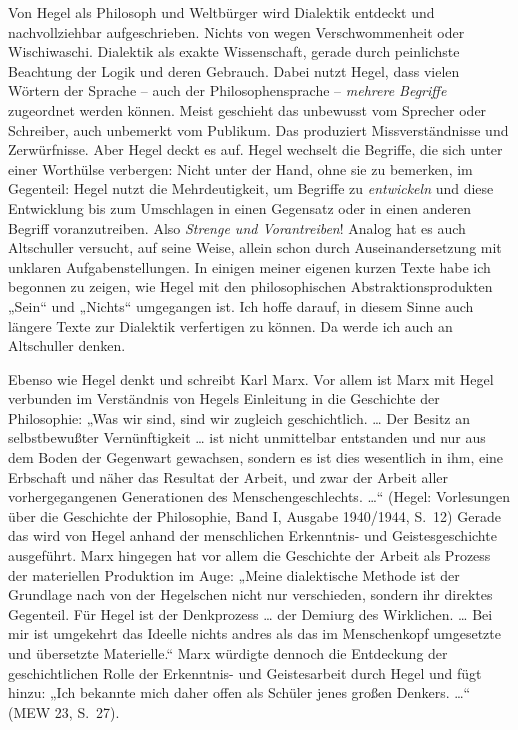 \documentclass[12pt,a4paper]{article}
\begin{document}
Von Hegel als Philosoph und Weltbürger wird Dialektik entdeckt und
nachvollziehbar aufgeschrieben. Nichts von wegen Verschwommenheit oder
Wischiwaschi. Dialektik als exakte Wissenschaft, gerade durch peinlichste
Beachtung der Logik und deren Gebrauch. Dabei nutzt Hegel, dass vielen Wörtern
der Sprache – auch der Philosophensprache – \emph{mehrere Begriffe} zugeordnet
werden können. Meist geschieht das unbewusst vom Sprecher oder Schreiber, auch
unbemerkt vom Publikum. Das produziert Missverständnisse und Zerwürfnisse. Aber
Hegel deckt es auf. Hegel wechselt die Begriffe, die sich unter einer Worthülse
verbergen: Nicht unter der Hand, ohne sie zu bemerken, im Gegenteil: Hegel
nutzt die Mehrdeutigkeit, um Begriffe zu \emph{entwickeln} und diese
Entwicklung bis zum Umschlagen in einen Gegensatz oder in einen anderen Begriff
voranzutreiben.  Also \emph{Strenge und Vorantreiben\/}! Analog hat es auch
Altschuller versucht, auf seine Weise, allein schon durch Auseinandersetzung
mit unklaren Aufgabenstellungen. In einigen meiner eigenen kurzen Texte habe
ich begonnen zu zeigen, wie Hegel mit den philosophischen Abstraktionsprodukten
„Sein“ und „Nichts“ umgegangen ist. Ich hoffe darauf, in diesem Sinne auch
längere Texte zur Dialektik verfertigen zu können. Da werde ich auch an
Altschuller denken.

Ebenso wie Hegel denkt und schreibt Karl Marx. Vor allem ist Marx mit Hegel
verbunden im Verständnis von Hegels Einleitung in die Geschichte der
Philosophie: „Was wir sind, sind wir zugleich geschichtlich. … Der Besitz an
selbstbewußter Vernünftigkeit … ist nicht unmittelbar entstanden und nur aus
dem Boden der Gegenwart gewachsen, sondern es ist dies wesentlich in ihm, eine
Erbschaft und näher das Resultat der Arbeit, und zwar der Arbeit aller
vorhergegangenen Generationen des Menschengeschlechts. …“ (Hegel: Vorlesungen
über die Geschichte der Philosophie, Band I, Ausgabe 1940/1944, S.~12) Gerade
das wird von Hegel anhand der menschlichen Erkenntnis- und Geistesgeschichte
ausgeführt. Marx hingegen hat vor allem die Geschichte der Arbeit als Prozess
der materiellen Produktion im Auge: „Meine dialektische Methode ist der
Grundlage nach von der Hegelschen nicht nur verschieden, sondern ihr direktes
Gegenteil. Für Hegel ist der Denkprozess … der Demiurg des Wirklichen. … Bei
mir ist umgekehrt das Ideelle nichts andres als das im Menschenkopf umgesetzte
und übersetzte Materielle.“ Marx würdigte dennoch die Entdeckung der
geschichtlichen Rolle der Erkenntnis- und Geistesarbeit durch Hegel und fügt
hinzu: „Ich bekannte mich daher offen als Schüler jenes großen Denkers. …“ (MEW
23, S.~27).
\end{document}
